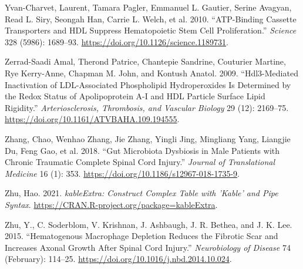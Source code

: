 \documentclass[9pt,lineno]{elife}
\newlength{\cslhangindent}
\newlength{\cslentryspacingunit} %
\newenvironment{CSLReferences}[2] %
 {%
  \setlength{\parindent}{0pt}
  \ifodd #1
  \let\oldpar\par
  \def\par{\hangindent=\cslhangindent\oldpar}
  \fi
  \setlength{\parskip}{#2\cslentryspacingunit}
 }%
 {}
\begin{document}
\begin{CSLReferences}{1}{0}
\leavevmode{}%
Yvan-Charvet, Laurent, Tamara Pagler, Emmanuel L. Gautier, Serine Avagyan, Read L. Siry, Seongah Han, Carrie L. Welch, et al. 2010. {``{ATP-Binding Cassette Transporters} and {HDL Suppress Hematopoietic Stem Cell Proliferation}.''} \emph{Science} 328 (5986): 1689--93. \url{https://doi.org/10.1126/science.1189731}.

\leavevmode{}%
Zerrad-Saadi Amal, Therond Patrice, Chantepie Sandrine, Couturier Martine, Rye Kerry-Anne, Chapman M. John, and Kontush Anatol. 2009. {``{Hdl3-Mediated Inactivation} of {LDL-Associated Phospholipid Hydroperoxides Is Determined} by the {Redox Status} of {Apolipoprotein A-I} and {HDL Particle Surface Lipid Rigidity}.''} \emph{Arteriosclerosis, Thrombosis, and Vascular Biology} 29 (12): 2169--75. \url{https://doi.org/10.1161/ATVBAHA.109.194555}.

\leavevmode{}%
Zhang, Chao, Wenhao Zhang, Jie Zhang, Yingli Jing, Mingliang Yang, Liangjie Du, Feng Gao, et al. 2018. {``Gut Microbiota Dysbiosis in Male Patients with Chronic Traumatic Complete Spinal Cord Injury.''} \emph{Journal of Translational Medicine} 16 (1): 353. \url{https://doi.org/10.1186/s12967-018-1735-9}.

\leavevmode{}%
Zhu, Hao. 2021. \emph{kableExtra: Construct Complex Table with 'Kable' and Pipe Syntax}. \url{https://CRAN.R-project.org/package=kableExtra}.

\leavevmode{}%
Zhu, Y., C. Soderblom, V. Krishnan, J. Ashbaugh, J. R. Bethea, and J. K. Lee. 2015. {``Hematogenous Macrophage Depletion Reduces the Fibrotic Scar and Increases Axonal Growth After Spinal Cord Injury.''} \emph{Neurobiology of Disease} 74 (February): 114--25. \url{https://doi.org/10.1016/j.nbd.2014.10.024}.

\end{CSLReferences}
\end{document}
